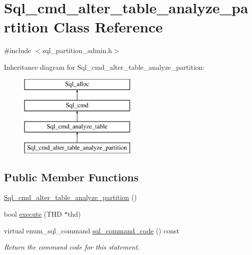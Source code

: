 \hypertarget{classSql__cmd__alter__table__analyze__partition}{}\section{Sql\+\_\+cmd\+\_\+alter\+\_\+table\+\_\+analyze\+\_\+partition Class Reference}
\label{classSql__cmd__alter__table__analyze__partition}


{\ttfamily \#include $<$sql\+\_\+partition\+\_\+admin.\+h$>$}

Inheritance diagram for Sql\+\_\+cmd\+\_\+alter\+\_\+table\+\_\+analyze\+\_\+partition\+:\begin{figure}[H]
\begin{center}
\leavevmode
\includegraphics[height=4.000000cm]{classSql__cmd__alter__table__analyze__partition}
\end{center}
\end{figure}
\subsection*{Public Member Functions}
\begin{DoxyCompactItemize}
\item 
\mbox{\hyperlink{classSql__cmd__alter__table__analyze__partition_a90b9b6e99f2dbb8b9a91cdd3bc8d4cf2}{Sql\+\_\+cmd\+\_\+alter\+\_\+table\+\_\+analyze\+\_\+partition}} ()
\item 
bool \mbox{\hyperlink{classSql__cmd__alter__table__analyze__partition_a71c5e17563536e65e9a048a1205b4fbd}{execute}} (T\+HD $\ast$thd)
\item 
\mbox{\label{classSql__cmd__alter__table__analyze__partition_afdd9e75f7399bfec185aaecabda6e67d}} 
virtual enum\+\_\+sql\+\_\+command \mbox{\hyperlink{classSql__cmd__alter__table__analyze__partition_afdd9e75f7399bfec185aaecabda6e67d}{sql\+\_\+command\+\_\+code}} () const
\begin{DoxyCompactList}\small\item\em Return the command code for this statement. \end{DoxyCompactList}\end{DoxyCompactItemize}
